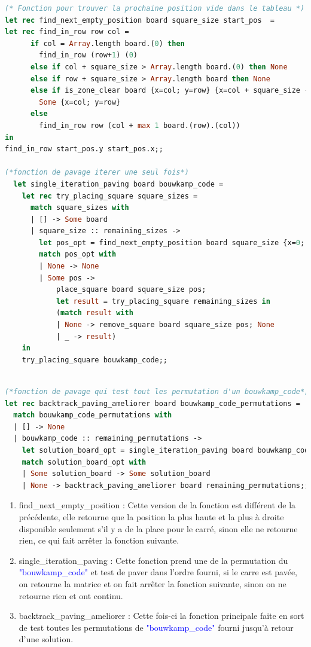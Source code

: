 \documentclass{article}
\begin{document}
\begin{lstlisting}[language=Caml]
(* Fonction pour trouver la prochaine position vide dans le tableau *)
let rec find_next_empty_position board square_size start_pos  =
let rec find_in_row row col =
      if col = Array.length board.(0) then
        find_in_row (row+1) (0)
      else if col + square_size > Array.length board.(0) then None
      else if row + square_size > Array.length board then None
      else if is_zone_clear board {x=col; y=row} {x=col + square_size - 1; y=row + square_size - 1} 0 then
        Some {x=col; y=row}
      else 
        find_in_row row (col + max 1 board.(row).(col))
in
find_in_row start_pos.y start_pos.x;;

(*fonction de pavage iterer une seul fois*)
  let single_iteration_paving board bouwkamp_code =
    let rec try_placing_square square_sizes =
      match square_sizes with
      | [] -> Some board
      | square_size :: remaining_sizes ->
        let pos_opt = find_next_empty_position board square_size {x=0; y=0} in
        match pos_opt with
        | None -> None
        | Some pos ->
            place_square board square_size pos;
            let result = try_placing_square remaining_sizes in
            (match result with
            | None -> remove_square board square_size pos; None
            | _ -> result)
    in
    try_placing_square bouwkamp_code;;
\end{lstlisting}
\newpage
\begin{lstlisting}[language=Caml]

(*fonction de pavage qui test tout les permutation d'un bouwkamp_code*)
let rec backtrack_paving_ameliorer board bouwkamp_code_permutations =
  match bouwkamp_code_permutations with
  | [] -> None
  | bouwkamp_code :: remaining_permutations ->
    let solution_board_opt = single_iteration_paving board bouwkamp_code in
    match solution_board_opt with
    | Some solution_board -> Some solution_board
    | None -> backtrack_paving_ameliorer board remaining_permutations;;
\end{lstlisting}


\begin{enumerate}
  \item find\_next\_empty\_position : Cette version de la fonction est différent de la précédente, elle retourne que la position la plus haute et la plus à droite disponible seulement s'il y a de la place pour le carré, sinon elle ne retourne rien, ce qui fait arrêter la fonction suivante. \newline
  \item single\_iteration\_paving : Cette fonction prend une de la permutation du \textcolor{blue}{"bouwkamp\_code"} et test de paver dans l'ordre fourni, si le carre est pavée, on retourne la matrice et on fait arrêter la fonction suivante, sinon on ne retourne rien et ont continu.\newline
  \item backtrack\_paving\_ameliorer  : Cette fois-ci la fonction principale faite en sort de test toutes les permutations de \textcolor{blue}{"bouwkamp\_code"} fourni  jusqu'à retour d'une solution.\newline
\end{enumerate}
\end{document}
